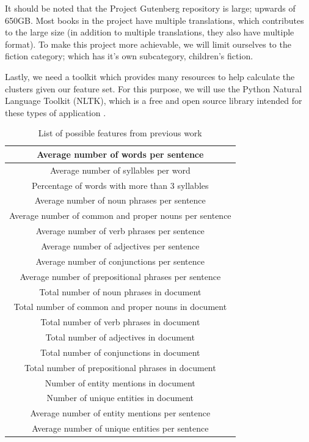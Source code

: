 \documentclass[]{article}
\begin{document}
It should be noted that the Project Gutenberg repository is large; upwards of 650GB.
Most books in the project have multiple translations, which contributes to the large size (in addition to multiple translations, they also have multiple format).
To make this project more achievable, we will limit ourselves to the fiction category; which has it's own subcategory, children's fiction.

Lastly, we need a toolkit which provides many resources to help calculate the clusters given our feature set.
For this purpose, we will use the Python Natural Language Toolkit (NLTK), which is a free and open source library intended for these types of application \cite{ref:evolution_of_jun}.



\begin{table}
	\begin{center}
		\begin{tabular}{| c |} \hline
			Average number of words per sentence \\ \hline
			Average number of syllables per word \\ \hline
			Percentage of words with more than 3 syllables \\ \hline
			Average number of noun phrases per sentence \\ \hline
			Average number of common and proper nouns per sentence \\ \hline
			Average number of verb phrases per sentence \\ \hline
			Average number of adjectives per sentence \\  \hline
			Average number of conjunctions per sentence \\ \hline
			Average number of prepositional phrases per sentence \\ \hline
			Total number of noun phrases in document \\ \hline
			Total number of common and proper nouns in document \\ \hline
			Total number of verb phrases in document \\ \hline
			Total number of adjectives in document \\ \hline
			Total number of conjunctions in document \\ \hline
			Total number of prepositional phrases in document \\ \hline
			Number of entity mentions in document \\ \hline
			Number of unique entities in document \\ \hline
			Average number of entity mentions per sentence \\ \hline
			Average number of unique entities per sentence \\ \hline
		\end{tabular}
	\end{center}
\caption{List of possible features from previous work\cite{}}
\label{table:features1}
\end{table}
\end{document}

